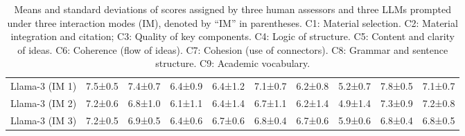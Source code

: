 \begin{table*}[]
\begin{tabular}{llllllllll}
   Llama-3 (IM 1) & 7.5{\tiny±0.5} & 7.4{\tiny±0.7} & 6.4{\tiny±0.9} & 6.4{\tiny±1.2} & 7.1{\tiny±0.7} & 6.2{\tiny±0.8} & 5.2{\tiny±0.7} & 7.8{\tiny±0.5} & 7.1{\tiny±0.7} \\
   Llama-3 (IM 2) & 7.2{\tiny±0.6} & 6.8{\tiny±1.0} & 6.1{\tiny±1.1} & 6.4{\tiny±1.4} & 6.7{\tiny±1.1} & 6.2{\tiny±1.4} & 4.9{\tiny±1.4} & 7.3{\tiny±0.9} & 7.2{\tiny±0.8} \\
   Llama-3 (IM 3) & 7.2{\tiny±0.5} & 6.9{\tiny±0.5} & 6.4{\tiny±0.6} & 6.7{\tiny±0.6} & 6.8{\tiny±0.4} & 6.7{\tiny±0.6} & 5.9{\tiny±0.6} & 6.8{\tiny±0.4} & 6.8{\tiny±0.5} \\
\bottomrule
\end{tabular}

    \caption{Means and standard deviations of scores assigned by three human assessors and three LLMs prompted under three interaction modes (IM), denoted by ``IM'' in parentheses. C1: Material selection. C2: Material integration and citation; C3: Quality of key components. C4: Logic of structure. C5: Content and clarity of ideas. C6: Coherence (flow of ideas). C7: Cohesion (use of connectors). C8: Grammar and sentence structure. C9: Academic vocabulary.}
    \label{tab:descStats}
\end{table*}

